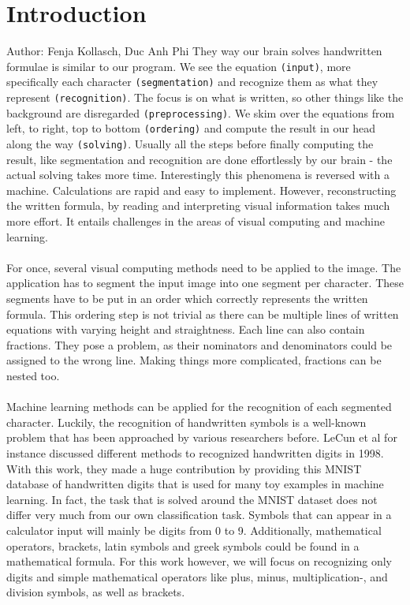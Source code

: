 \documentclass[11pt]{article}
\begin{document}
	\section{Introduction}
		\small{Author: Fenja Kollasch, Duc Anh Phi} \newline \newline
	They way our brain solves handwritten formulae is similar to our program. We see the equation \texttt{(input)}, more specifically each character \texttt{(segmentation)} and recognize them as what they represent \texttt{(recognition)}. The focus is on what is written, so other things like the background are disregarded \texttt{(preprocessing)}. We skim over the equations from left, to right, top to bottom \texttt{(ordering)} and compute the result in our head along the way \texttt{(solving)}. Usually all the steps before finally computing the result, like segmentation and recognition are done effortlessly by our brain - the actual solving takes more time. Interestingly this phenomena is reversed with a machine. Calculations are rapid and easy to implement. However, reconstructing the written formula, by reading and interpreting visual information takes much more effort. It entails challenges in the areas of visual computing and machine learning.\\\\
	For once, several visual computing methods need to be applied to the image. The application has to segment the input image into one segment per character. These segments have to be put in an order which correctly represents the written formula. This ordering step is not trivial as there can be multiple lines of written equations with varying height and straightness. Each line can also contain fractions. They pose a problem, as their nominators and denominators could be assigned to the wrong line. Making things more complicated, fractions can be nested too.\\\\
	Machine learning methods can be applied for the recognition of each segmented character. Luckily, the recognition of handwritten symbols is a well-known problem that has been approached by various researchers before. LeCun et al \cite{lecun1998} for instance discussed different methods to recognized handwritten digits in 1998. With this work, they made a huge contribution by providing this MNIST database of handwritten digits \cite{mnist} that is used for many toy examples in machine learning. In fact, the task that is solved around the MNIST dataset does not differ very much from our own classification task. Symbols that can appear in a calculator input will mainly be digits from 0 to 9. Additionally, mathematical operators, brackets, latin symbols and greek symbols could be found in a mathematical formula. For this work however, we will focus on recognizing only digits and simple mathematical operators like plus, minus, multiplication-, and division symbols, as well as brackets.\\\\
\end{document}
